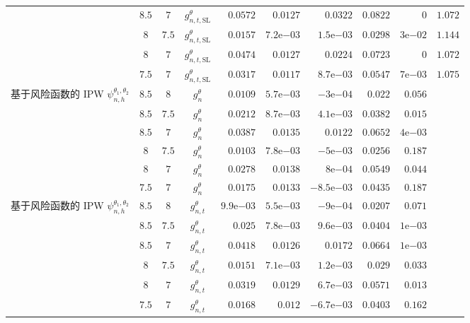 \begin{longtable}{@{}p{2.55cm}cccrrrrrr@{}}
 & $8.5$ & $7$ & $g^\theta_{n,t,\mathrm{SL}}$ & $0.0572$ & $0.0127$ & $0.0322$ & $0.0822$ & $0$ & $1.072$\\
 & $8$ & $7.5$ & $g^\theta_{n,t,\mathrm{SL}}$ & $0.0157$ & $7.2\mathrm e{-03}$ & $1.5\mathrm e{-03}$ & $0.0298$ & $3\mathrm e{-02}$ & $1.144$\\
 & $8$ & $7$ & $g^\theta_{n,t,\mathrm{SL}}$ & $0.0474$ & $0.0127$ & $0.0224$ & $0.0723$ & $0$ & $1.072$\\
 & $7.5$ & $7$ & $g^\theta_{n,t,\mathrm{SL}}$ & $0.0317$ & $0.0117$ & $8.7\mathrm e{-03}$ & $0.0547$ & $7\mathrm e{-03}$ & $1.075$\\
\midrule
\shortstack[l]{基于风险函数的 IPW\\$\psi^{\theta_1,\theta_2}_{n,h}$} & $8.5$ & $8$ & $g_n^\theta$ & $0.0109$ & $5.7\mathrm e{-03}$ & $-3\mathrm e{-04}$ & $0.022$ & $0.056$ & \\
 & $8.5$ & $7.5$ & $g_n^\theta$ & $0.0212$ & $8.7\mathrm e{-03}$ & $4.1\mathrm e{-03}$ & $0.0382$ & $0.015$ & \\
 & $8.5$ & $7$ & $g_n^\theta$ & $0.0387$ & $0.0135$ & $0.0122$ & $0.0652$ & $4\mathrm e{-03}$ & \\
 & $8$ & $7.5$ & $g_n^\theta$ & $0.0103$ & $7.8\mathrm e{-03}$ & $-5\mathrm e{-03}$ & $0.0256$ & $0.187$ & \\
 & $8$ & $7$ & $g_n^\theta$ & $0.0278$ & $0.0138$ & $8\mathrm e{-04}$ & $0.0549$ & $0.044$ & \\
 & $7.5$ & $7$ & $g_n^\theta$ & $0.0175$ & $0.0133$ & $-8.5\mathrm e{-03}$ & $0.0435$ & $0.187$ & \\
\midrule
\shortstack[l]{基于风险函数的 IPW\\$\psi^{\theta_1,\theta_2}_{n,h}$} & $8.5$ & $8$ & $g^\theta_{n,t}$ & $9.9\mathrm e{-03}$ & $5.5\mathrm e{-03}$ & $-9\mathrm e{-04}$ & $0.0207$ & $0.071$ & \\
 & $8.5$ & $7.5$ & $g^\theta_{n,t}$ & $0.025$ & $7.8\mathrm e{-03}$ & $9.6\mathrm e{-03}$ & $0.0404$ & $1\mathrm e{-03}$ & \\
 & $8.5$ & $7$ & $g^\theta_{n,t}$ & $0.0418$ & $0.0126$ & $0.0172$ & $0.0664$ & $1\mathrm e{-03}$ & \\
 & $8$ & $7.5$ & $g^\theta_{n,t}$ & $0.0151$ & $7.1\mathrm e{-03}$ & $1.2\mathrm e{-03}$ & $0.029$ & $0.033$ & \\
 & $8$ & $7$ & $g^\theta_{n,t}$ & $0.0319$ & $0.0129$ & $6.7\mathrm e{-03}$ & $0.0571$ & $0.013$ & \\
 & $7.5$ & $7$ & $g^\theta_{n,t}$ & $0.0168$ & $0.012$ & $-6.7\mathrm e{-03}$ & $0.0403$ & $0.162$ & \\

\end{longtable}
